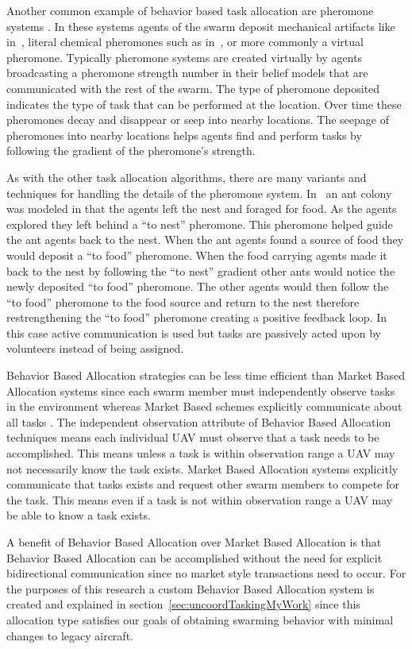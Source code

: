 Another common example of behavior based task allocation are pheromone systems \parencite{p2p_pheromone, manet_pheromone}.  In these systems agents of the swarm deposit mechanical artifacts like in~\textcite{beacon_pheromone}, literal chemical pheromones such as in~\textcite{ethanol_swarm}, or more commonly a virtual pheromone.  Typically pheromone systems are created virtually by agents broadcasting a pheromone strength number in their belief models that are communicated with the rest of the swarm. The type of pheromone deposited indicates the type of task that can be performed at the location.  Over time these pheromones decay and disappear or seep into nearby locations.  The seepage of pheromones into nearby locations helps agents find and perform tasks by following the gradient of the pheromone's strength.

As with the other task allocation algorithms, there are many variants and techniques for handling the details of the pheromone system.  In~\textcite{pheromone} an ant colony was modeled in that the agents left the nest and foraged for food.  As the agents explored they left behind a ``to nest'' pheromone.  This pheromone helped guide the ant agents back to the nest.  When the ant agents found a source of food they would deposit a ``to food'' pheromone.  When the food carrying agents made it back to the nest by following the ``to nest'' gradient other ants would notice the newly deposited ``to food'' pheromone.  The other agents would then follow the ``to food'' pheromone to the food source and return to the nest therefore restrengthening the ``to food'' pheromone creating a positive feedback loop.  In this case active communication is used but tasks are passively acted upon by volunteers instead of being assigned.

Behavior Based Allocation strategies can be less time efficient than Market Based Allocation systems since each swarm member must independently observe tasks in the environment whereas Market Based schemes explicitly communicate about all tasks \parencite{bba_vs_mba_1, bba_vs_mba_2}.  The independent observation attribute of Behavior Based Allocation techniques means each individual UAV must observe that a task needs to be accomplished.  This means unless a task is within observation range a UAV may not necessarily know the task exists.  Market Based Allocation systems explicitly communicate that tasks exists and request other swarm members to compete for the task.  This means even if a task is not within observation range a UAV may be able to know a task exists.

A benefit of Behavior Based Allocation over Market Based Allocation is that Behavior Based Allocation can be accomplished without the need for explicit bidirectional communication since no market style transactions need to occur.  For the purposes of this research a custom Behavior Based Allocation system is created and explained in section~\ref{sec:uncoordTaskingMyWork} since this allocation type satisfies our goals of obtaining swarming behavior with minimal changes to legacy aircraft.